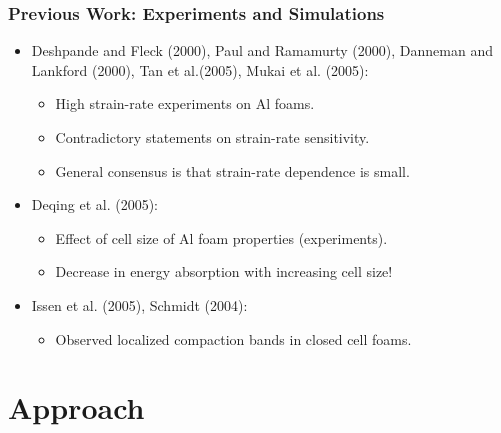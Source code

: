 \documentclass{beamer}
\begin{document}
    \begin{frame}
      \frametitle{Previous Work: Experiments and Simulations}
      \begin{itemize}[<+-| alert@+>]
        \item Deshpande and Fleck (2000), Paul and Ramamurty (2000),
              Danneman and Lankford (2000), Tan et al.(2005),
              Mukai et al. (2005):
          \begin{itemize}
            \item High strain-rate experiments on Al foams.
            \item Contradictory statements on strain-rate sensitivity.
            \item General consensus is that strain-rate dependence is
                  small.
          \end{itemize}
        \item Deqing et al. (2005):
          \begin{itemize}
            \item Effect of cell size of Al foam properties (experiments).
            \item Decrease in energy absorption with increasing cell size!
          \end{itemize}
        \item Issen et al. (2005), Schmidt (2004):
          \begin{itemize}
            \item Observed localized compaction bands in closed cell foams.
          \end{itemize}
      \end{itemize}
    \end{frame}

  \section{Approach}
\end{document}
